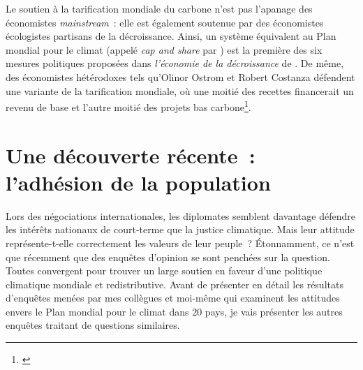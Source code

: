 \documentclass[a5paper,french,openany]{memoir}
\begin{document}
Le soutien à la tarification mondiale du carbone n'est pas l'apanage des économistes \textit{mainstream}~: elle est également soutenue par des économistes  écologistes partisans de la décroissance. Ainsi, un système équivalent au Plan mondial pour le climat (appelé \textit{cap and share} par \citealp{douthwaite_degrowth_2012}) est la première des six mesures politiques proposées dans \textit{l'économie de la décroissance} de \cite{kallis_economics_2012}. De même, des économistes hétérodoxes tels qu'Olinor Ostrom et Robert Costanza défendent une variante de la tarification mondiale, où une moitié des recettes  financerait un revenu de base et l'autre moitié des projets bas carbone\footnote{\cite{barnes_creating_2008}}.%

\section{Une découverte récente~: l'adhésion de la population} \label{sec:soutien}

Lors des négociations internationales, les diplomates semblent davantage défendre les intérêts nationaux de court-terme que la justice climatique. 
Mais leur attitude représente-t-elle correctement les valeurs de leur peuple~? 
Étonnamment, ce n'est que récemment que des enquêtes d'opinion se sont penchées sur la question. Toutes convergent pour trouver un large soutien en faveur d'une politique climatique mondiale et redistributive. Avant de présenter en détail les résultats d'enquêtes menées par mes collègues et moi-même qui examinent les attitudes envers le Plan mondial pour le climat dans 20 pays, %
je vais présenter les autres enquêtes traitant de questions similaires. 
\end{document}
